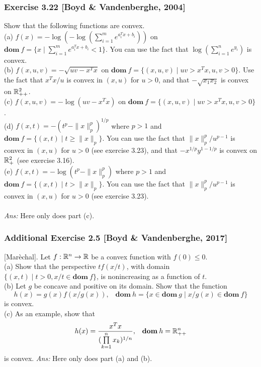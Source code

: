 \documentclass[12pt,a4paper]{article}
\newcommand{\ra}[1]{\ifnum #1=1\rightarrow\fi\ifnum #1=2\Rightarrow\fi\ifnum #1=3\Rrightarrow\fi\ifnum #1=4\rightrightarrows\fi\ifnum #1=5\rightleftarrows\fi\ifnum #1=6\mapsto\fi\ifnum #1=7\iffalse\fi\fi\ifnum #1=8\twoheadrightarrow\fi\ifnum #1=9\rightharpoonup\fi\ifnum #1=0\rightharpoondown\fi}
\newcommand{\PROD}[2]{\prod\limits_{#1}^{#2}}
\newcommand\dom{\mathbf{dom\:}}
\def\R{\ifmmode\mathbb R\fi}
\begin{document}
\newpage\subsubsection*{Exercise 3.22 [Boyd \& Vandenberghe, 2004]}
 Show that the following functions are convex. \\
(a) $f(x) = -\log(-\log(\sum^m_{i=1} e^{a_i^T x + b_i}))$ on $\dom f = \{x \mid \sum^m_{i=1} e^{a_i^T x + b_i} < 1\}$. You can use the fact that $\log(\sum^n_{i=1} e^{y_i})$ is convex.\\
(b) $f(x, u, v) = -\sqrt{uv-x^Tx}$ on $\dom f = \{(x,u,v) \mid uv>x^T x, u, v>0\}$. Use the fact that $x^T x/u$ is convex in $(x, u)$ for $u>0$, and that $-\sqrt{x_1x_2}$ is convex on $\R^2_{++}$. \\
(c) $f(x,u,v) = -\log(uv-x^Tx)$ on $\dom f = \{(x,u,v) \mid uv>x^Tx, u,v>0\}$.\\
(d) $f(x,t) = -(t^p - \|x\|_p^p)^{1/p}$ where $p>1$ and $\dom f = \{(x, t) \mid t\geq \|x\|_p\}$. You can use the fact that $\|x\|^p_p/u^{p-1}$ is convex in $(x,u)$ for $u>0$ (see exercise 3.23), and that $-x^{1/p}y^{1-1/p}$ is convex on $\R^2_+$ (see exercise 3.16). \\
(e) $f(x,t) = -\log(t^p - \|x\|_p^p)$ where $p>1$ and $\dom f = \{(x,t) \mid t>\|x\|_p\}$. You can use the fact that $\|x\|^p_p/u^{p-1}$ is convex in $(x,u)$ for $u>0$ (see exercise 3.23).\\
\\
{\it Ans:} Here only does part (c). 


\newpage\subsubsection*{Additional Exercise 2.5 [Boyd \& Vandenberghe, 2017]}
 [Mar\`echal]. Let $f:\R^n\ra1\R$ be a convex function with $f(0) \leq 0$.\\
(a) Show that the perspective $tf(x/t)$, with domain $\{(x,t)\mid t>0, x/t \in \dom f\}$, is nonincreasing as a function of $t$. \\
(b) Let $g$ be concave and positive on its domain. Show that the function
$$h(x) = g(x)f(x/g(x)), \;\;\; \dom h = \{x\in\dom g\mid x/g(x) \in \dom f\}$$
is convex. \\
(c) As an example, show that 
$$h(x) = \frac{x^Tx}{(\PROD{k=1}n x_k)^{1/n}}, \;\;\; \dom h = \R^n_{++}$$
is convex.
{\it Ans:} Here only does part (a) and (b). 
\end{document}
